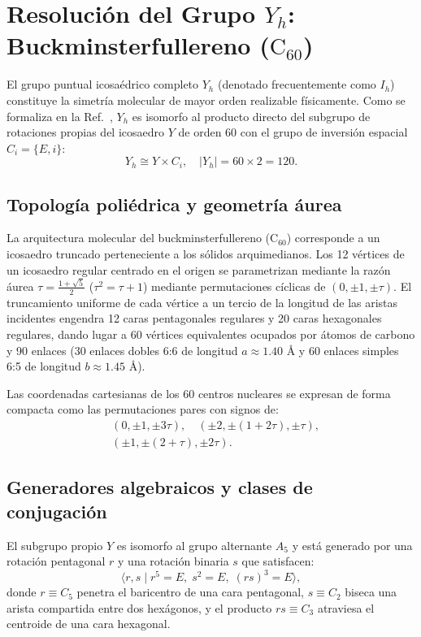 \section{Resolución del Grupo $Y_h$: Buckminsterfullereno ($\text{C}_{60}$)}
\label{sec:yh}

El grupo puntual icosaédrico completo $Y_h$ (denotado frecuentemente como $I_h$) constituye la simetría molecular de mayor orden realizable físicamente. Como se formaliza en la Ref.~\cite{Ramadevi2019}, $Y_h$ es isomorfo al producto directo del subgrupo de rotaciones propias del icosaedro $Y$ de orden 60 con el grupo de inversión espacial $C_i = \{E, i\}$:
\begin{equation}
Y_h \cong Y \times C_i, \quad |Y_h| = 60 \times 2 = 120.
\label{eq:yh_direct_product}
\end{equation}

\subsection{Topología poliédrica y geometría áurea}
La arquitectura molecular del buckminsterfullereno ($\text{C}_{60}$) corresponde a un icosaedro truncado perteneciente a los sólidos arquimedianos. Los 12 vértices de un icosaedro regular centrado en el origen se parametrizan mediante la razón áurea $\tau = \frac{1+\sqrt{5}}{2}$ ($\tau^2 = \tau + 1$) mediante permutaciones cíclicas de $(0, \pm 1, \pm \tau)$. El truncamiento uniforme de cada vértice a un tercio de la longitud de las aristas incidentes engendra 12 caras pentagonales regulares y 20 caras hexagonales regulares, dando lugar a 60 vértices equivalentes ocupados por átomos de carbono y 90 enlaces (30 enlaces dobles 6:6 de longitud $a \approx 1.40\text{ \AA}$ y 60 enlaces simples 6:5 de longitud $b \approx 1.45\text{ \AA}$).

Las coordenadas cartesianas de los 60 centros nucleares se expresan de forma compacta como las permutaciones pares con signos de:
\begin{align}
&(0, \pm 1, \pm 3\tau), \quad (\pm 2, \pm (1+2\tau), \pm \tau), \nonumber \\
&(\pm 1, \pm (2+\tau), \pm 2\tau).
\label{eq:c60_coords}
\end{align}

\subsection{Generadores algebraicos y clases de conjugación}
El subgrupo propio $Y$ es isomorfo al grupo alternante $A_5$ y está generado por una rotación pentagonal $r$ y una rotación binaria $s$ que satisfacen:
\begin{equation}
\langle r, s \mid r^5 = E, \; s^2 = E, \; (rs)^3 = E \rangle,
\end{equation}
donde $r \equiv C_5$ penetra el baricentro de una cara pentagonal, $s \equiv C_2$ biseca una arista compartida entre dos hexágonos, y el producto $rs \equiv C_3$ atraviesa el centroide de una cara hexagonal.

